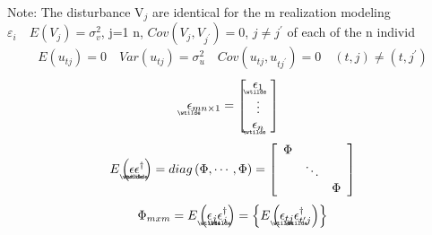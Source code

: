 \documentclass{article}
\begin{document}
Note: The disturbance V$_{j}$ are identical for the m realization modeling $%
\varepsilon _{i}\quad E\left( V_{j}\right) =\sigma _{v}^{2}$, j=1%
n, $Cov\left( V_{j},V_{j^{\prime }}\right) =0$, $j\neq j^{\prime }$ of each
of the n individ%
\begin{equation*}
E\left( u_{tj}\right) =0\quad Var\left( u_{tj}\right) =\sigma _{u}^{2}\quad
Cov\left( u_{tj},u_{tj^{\prime }}\right) =0\quad \left( t,j\right) \neq
\left( t,j^{\prime }\right) 
\end{equation*}%
\begin{equation*}
\underaccent{\wtilde}{\epsilon}%
_{mn\times 1}=\left[ 
\begin{array}{c}
\underaccent{\wtilde}{\epsilon}%
_{1} \\ 
\vdots  \\ 
\underaccent{\wtilde}{\epsilon}%
_{n}%
\end{array}%
\right] 
\end{equation*}%
\begin{equation*}
E\left( 
\underaccent{\wtilde}{\epsilon}%
\underaccent{\wtilde}{\epsilon}%
^{\dagger }\right) =diag\left( \Phi ,\cdots ,\Phi \right) =\left[ 
\begin{array}{ccc}
\Phi  &  &  \\ 
& \ddots  &  \\ 
&  & \Phi 
\end{array}%
\right] 
\end{equation*}%
\begin{equation*}
\Phi _{mxm}=E\left( 
\underaccent{\wtilde}{\epsilon}%
_{j}%
\underaccent{\wtilde}{\epsilon}%
_{j}^{\dagger }\right) =\left\{ E\left( 
\underaccent{\wtilde}{\epsilon}%
_{tj}%
\underaccent{\wtilde}{\epsilon}%
_{t^{\prime }j}^{\dagger }\right) \right\} 
\end{equation*}%
\end{document}
